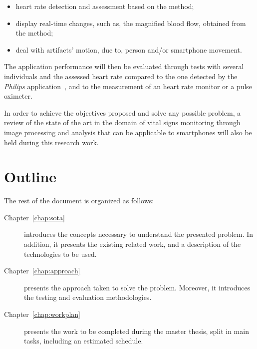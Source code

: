 \begin{itemize}
  \item heart rate detection and assessment based on the \evm{}
        method;
  \item display real-time changes, such as, the magnified blood
        flow, obtained from the \evm{} method;
  \item deal with artifacts' motion, due to, person and/or
        smartphone movement.
\end{itemize}

The application performance will then be evaluated through tests
with several individuals and the assessed heart rate compared to
the one detected by the \emph{Philips} application~\cite{Philips2013},
and to the measurement of an heart rate monitor or a pulse
oximeter.

In order to achieve the objectives proposed and solve any possible
problem, a review of the state of the art in the domain of vital
signs monitoring through image processing and analysis that can be
applicable to smartphones will also be held during this research work.

\pagebreak

\section{Outline} \label{sec:intro:outline}

The rest of the document is organized as follows:

\begin{description}
  \item[Chapter~\ref{chap:sota}] introduces the concepts necessary to
        understand the presented problem. In addition, it presents
        the existing related work, and a description of the technologies
        to be used.
  \item[Chapter~\ref{chap:approach}] presents the approach taken to
        solve the problem. Moreover, it introduces the testing and
        evaluation methodologies.
  \item[Chapter~\ref{chap:workplan}] presents the work to be completed
        during the master thesis, split in main tasks, including an
        estimated schedule.
\end{description}
